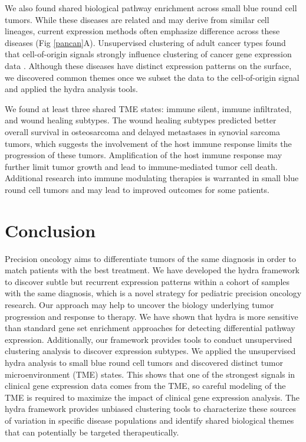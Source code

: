 \documentclass[10pt,letterpaper]{article}
\begin{document}
We also found shared biological pathway enrichment across small blue round cell tumors. While these diseases are related and may derive from similar cell lineages, current expression methods often emphasize difference across these diseases (Fig \ref{pancan}A). Unsupervised clustering of adult cancer types found that cell-of-origin signals strongly influence clustering of cancer gene expression data \cite{hoadleyCellofOriginPatternsDominate2018}. Although these diseases have distinct expression patterns on the surface, we discovered common themes once we subset the data to the cell-of-origin signal and applied the hydra analysis tools.

We found at least three shared TME states: immune silent, immune infiltrated, and wound healing subtypes. The wound healing subtypes predicted better overall survival in osteosarcoma and delayed metastases in synovial sarcoma tumors, which suggests the involvement of the host immune response limits the progression of these tumors. Amplification of the host immune response may further limit tumor growth and lead to immune-mediated tumor cell death. Additional research into immune modulating therapies is warranted in small blue round cell tumors and may lead to improved outcomes for some patients.

\section*{Conclusion}
Precision oncology aims to differentiate tumors of the same diagnosis in order to match patients with the best treatment. We have developed the hydra framework to discover subtle but recurrent expression patterns within a cohort of samples with the same diagnosis, which is a novel strategy for pediatric precision oncology research. Our approach may help to uncover the biology underlying tumor progression and response to therapy. We have shown that hydra is more sensitive than standard gene set enrichment approaches for detecting differential pathway expression. Additionally, our framework provides tools to conduct unsupervised clustering analysis to discover expression subtypes. We applied the unsupervised hydra analysis to small blue round cell tumors and discovered distinct tumor microenvironment (TME) states. This shows that one of the strongest signals in clinical gene expression data comes from the TME, so careful modeling of the TME is required to maximize the impact of clinical gene expression analysis. The hydra framework provides unbiased clustering tools to characterize these sources of variation in specific disease populations and identify shared biological themes that can potentially be targeted therapeutically.
\end{document}
